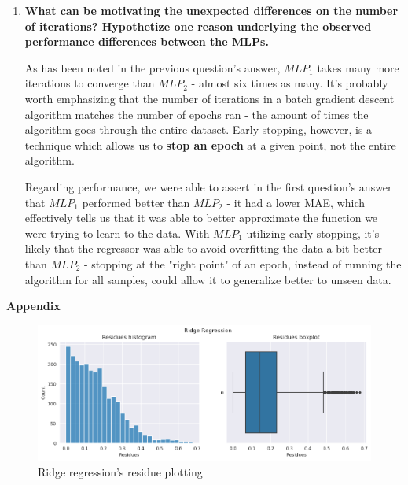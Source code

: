 \documentclass[12pt]{article}
\begin{document}
\begin{enumerate}[leftmargin=\labelsep,resume]
  \item \textbf{What can be motivating the unexpected differences on the number of iterations?
          Hypothetize one reason underlying the observed performance differences between the MLPs.}

        As has been noted in the previous question's answer, $MLP_1$ takes many more
        iterations to converge than $MLP_2$ - almost six times as many. It's probably
        worth emphasizing that the number of iterations in a batch gradient descent
        algorithm matches the number of epochs ran - the amount of times the algorithm goes
        through the entire dataset. Early stopping, however, is a technique which
        allows us to \textbf{stop an epoch} at a given point, not the entire algorithm.


        Regarding performance, we were able to assert in the first question's answer
        that $MLP_1$ performed better than $MLP_2$ - it had a lower MAE, which
        effectively tells us that it was able to better approximate the function
        we were trying to learn to the data. With $MLP_1$ utilizing early stopping,
        it's likely that the regressor was able to avoid overfitting the data
        a bit better than $MLP_2$ - stopping at the "right point" of an epoch, instead
        of running the algorithm for all samples, could allow it to generalize
        better to unseen data.


\end{enumerate}

\pagebreak

\large{\textbf{Appendix}\vskip 0.3cm}




\begin{figure}[h]
  \centering
  \includegraphics[width=\textwidth]{../assets/ridge-plots.png}
  \caption{Ridge regression's residue plotting}
  \label{fig:ridge-plotting}
\end{figure}
\end{document}
